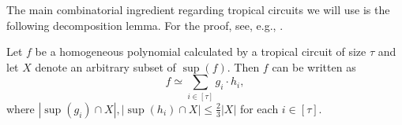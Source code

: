 The main combinatorial ingredient regarding tropical circuits we will use is the following decomposition lemma. For the proof, see, e.g., \cite[Lemma 3.4]{Jukna2023}.
\begin{lemma}\label{lem:tc_decomposition}
    Let $f$ be a homogeneous polynomial calculated by a tropical circuit of size $\tau$ and let $X$ denote an arbitrary subset of $\sup(f)$. Then $f$ can be written as
    $$
        f \simeq \sum_{i \in [\tau]} g_i \cdot h_i,
    $$
    where $|\sup(g_i) \cap X|, |\sup(h_i) \cap X| \leq \frac{2}{3}|X|$ for each $i \in [\tau]$.
\end{lemma}



